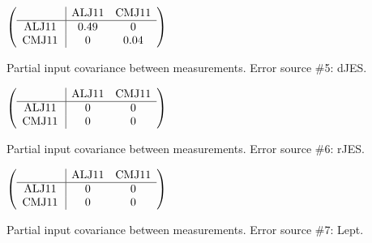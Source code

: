 \begin{table}[H]
\scriptsize
\begin{center}
\renewcommand{\arraystretch}{1.1}
\begin{math}\left(\begin{array}{c|cc}
 & \mathrm{ALJ11} & 
\mathrm{CMJ11} \\
\hline
\mathrm{ALJ11} \hspace*{2pt} &       0.49 &  0 \\
\mathrm{CMJ11} \hspace*{2pt} &  0 &       0.04 \\
\end{array}\right)\end{math}
\caption{Partial input covariance between measurements. Error source \#5: dJES.}
\renewcommand{\arraystretch}{1}
\end{center}
\end{table}
\begin{table}[H]
\scriptsize
\begin{center}
\renewcommand{\arraystretch}{1.1}
\begin{math}\left(\begin{array}{c|cc}
 & \mathrm{ALJ11} & 
\mathrm{CMJ11} \\
\hline
\mathrm{ALJ11} \hspace*{2pt} &  0 &  0 \\
\mathrm{CMJ11} \hspace*{2pt} &  0 &  0 \\
\end{array}\right)\end{math}
\caption{Partial input covariance between measurements. Error source \#6: rJES.}
\renewcommand{\arraystretch}{1}
\end{center}
\end{table}
\begin{table}[H]
\scriptsize
\begin{center}
\renewcommand{\arraystretch}{1.1}
\begin{math}\left(\begin{array}{c|cc}
 & \mathrm{ALJ11} & 
\mathrm{CMJ11} \\
\hline
\mathrm{ALJ11} \hspace*{2pt} &  0 &  0 \\
\mathrm{CMJ11} \hspace*{2pt} &  0 &  0 \\
\end{array}\right)\end{math}
\caption{Partial input covariance between measurements. Error source \#7: Lept.}
\renewcommand{\arraystretch}{1}
\end{center}
\end{table}
